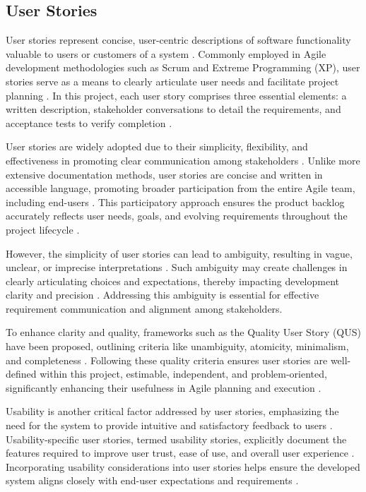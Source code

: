 \subsection{User Stories}

User stories represent concise, user-centric descriptions of software functionality valuable to users or customers of a system \cite{cohn2004user}\cite{cohn2004advantages}. Commonly employed in Agile development methodologies such as Scrum and Extreme Programming (XP), user stories serve as a means to clearly articulate user needs and facilitate project planning \cite{cohn2004user}\cite{cohn2004advantages}\cite{cao2008agile}. In this project, each user story comprises three essential elements: a written description, stakeholder conversations to detail the requirements, and acceptance tests to verify completion \cite{cohn2004user}\cite{cao2008agile}\cite{lucassen2016improving}.

User stories are widely adopted due to their simplicity, flexibility, and effectiveness in promoting clear communication among stakeholders \cite{choma2016userx}\cite{cohn2004advantages}. Unlike more extensive documentation methods, user stories are concise and written in accessible language, promoting broader participation from the entire Agile team, including end-users \cite{choma2016userx}. This participatory approach ensures the product backlog accurately reflects user needs, goals, and evolving requirements throughout the project lifecycle \cite{choma2016userx}\cite{cao2008agile}.

However, the simplicity of user stories can lead to ambiguity, resulting in vague, unclear, or imprecise interpretations \cite{amna2022ambiguity}. Such ambiguity may create challenges in clearly articulating choices and expectations, thereby impacting development clarity and precision \cite{amna2022ambiguity}. Addressing this ambiguity is essential for effective requirement communication and alignment among stakeholders.

To enhance clarity and quality, frameworks such as the Quality User Story (QUS) have been proposed, outlining criteria like unambiguity, atomicity, minimalism, and completeness \cite{lucassen2016improving}. Following these quality criteria ensures user stories are well-defined within this project, estimable, independent, and problem-oriented, significantly enhancing their usefulness in Agile planning and execution \cite{lucassen2016improving}.

Usability is another critical factor addressed by user stories, emphasizing the need for the system to provide intuitive and satisfactory feedback to users \cite{moreno2012agile}. Usability-specific user stories, termed usability stories, explicitly document the features required to improve user trust, ease of use, and overall user experience \cite{moreno2012agile}. Incorporating usability considerations into user stories helps ensure the developed system aligns closely with end-user expectations and requirements \cite{moreno2012agile}.


